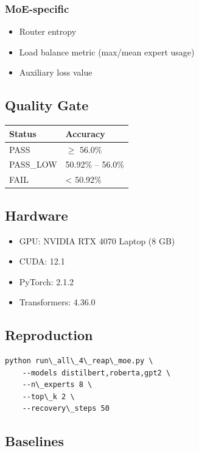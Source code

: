 \subsubsection{MoE-specific}
\begin{itemize}
\item Router entropy
\item Load balance metric (max/mean expert usage)
\item Auxiliary loss value

\end{itemize}
\subsection{Quality Gate}

\begin{table}[H]
\centering
\small
\begin{tabular}{ll}
\toprule
\textbf{Status} & \textbf{Accuracy} \\
\midrule
PASS & $\ge$ 56.0\% \\
PASS\_LOW & 50.92\% -- 56.0\% \\
FAIL & \textless{} 50.92\% \\
\bottomrule
\end{tabular}
\end{table}

\subsection{Hardware}

\begin{itemize}
\item GPU: NVIDIA RTX 4070 Laptop (8 GB)
\item CUDA: 12.1
\item PyTorch: 2.1.2
\item Transformers: 4.36.0

\end{itemize}
\subsection{Reproduction}

\begin{lstlisting}
python run\_all\_4\_reap\_moe.py \
    --models distilbert,roberta,gpt2 \
    --n\_experts 8 \
    --top\_k 2 \
    --recovery\_steps 50
\end{lstlisting}

\subsection{Baselines}

